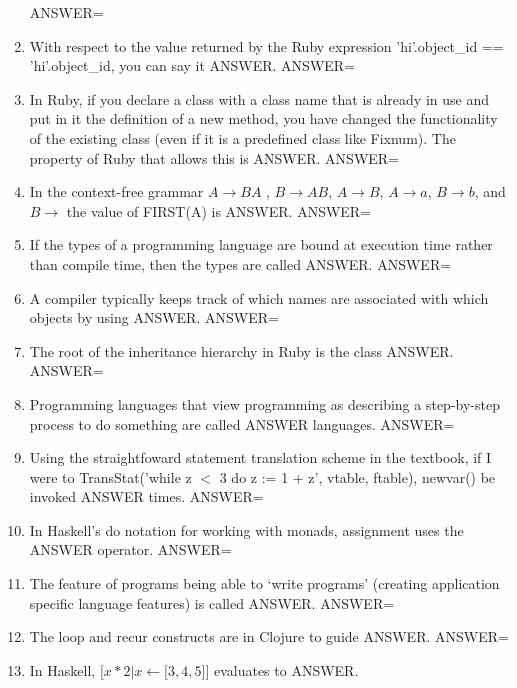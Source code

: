 \documentclass{exam}
\begin{document}
\begin{enumerate}
ANSWER=
\item With respect to the value returned by the Ruby expression 'hi'.object\_id == 'hi'.object\_id, you can say it ANSWER.\newline
ANSWER=
\item In Ruby, if you declare a class with a class name that is already in use and put in it the definition of a new method, you have changed the functionality of the existing class (even if it is a predefined class like Fixnum).  The property of Ruby that allows this is ANSWER.\newline
ANSWER=
\item In the context-free grammar $A \rightarrow B A$ , $B \rightarrow A B$, $A \rightarrow B$, $A \rightarrow a$, $B \rightarrow b$, and $B \rightarrow$  the value of FIRST(A) is ANSWER.\newline
ANSWER=
\item If the types of a programming language are bound at execution time rather than compile time, then the types are called ANSWER.\newline
ANSWER=
\item A compiler typically keeps track of which names are associated with which objects by using ANSWER.\newline
ANSWER=
\item The root of the inheritance hierarchy in Ruby is the class ANSWER.\newline
ANSWER=
\item Programming languages that view programming as describing a step-by-step process to do something are called ANSWER languages.\newline
ANSWER=
\item Using the straightfoward statement translation scheme in the textbook, if I were to TransStat('while z $<$ 3 do z := 1 + z', vtable, ftable), newvar() be invoked ANSWER times.\newline
ANSWER=
\item In Haskell's do notation for working with monads, assignment uses the ANSWER operator.\newline
ANSWER=
\item The feature of programs being able to `write programs' (creating application specific language features) is called ANSWER.\newline
ANSWER=
\item The loop and recur constructs are in Clojure to guide ANSWER.\newline
ANSWER=
\item In Haskell, $\lbrack x * 2 | x \leftarrow \lbrack 3, 4, 5\rbrack \rbrack$  evaluates to ANSWER.\newline

\end{enumerate}
\end{document}
